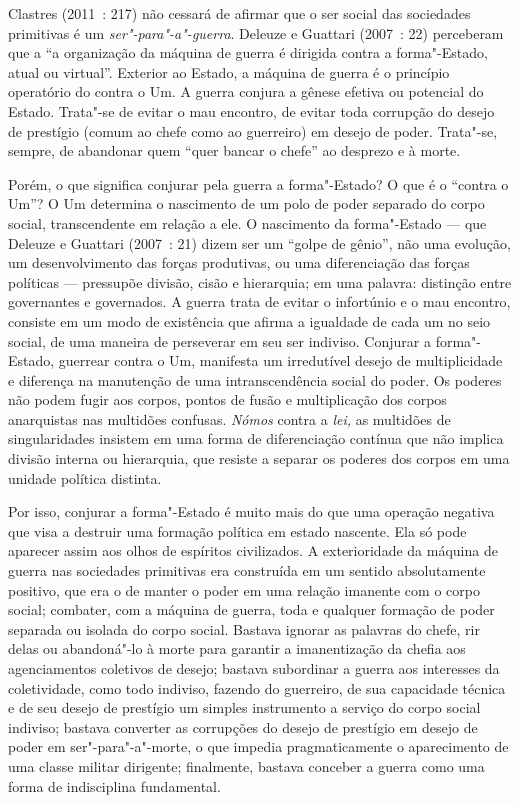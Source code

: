 Clastres (2011~: 217) não cessará de afirmar que o ser social das
sociedades primitivas é um \emph{ser"-para"-a"-guerra}. Deleuze e Guattari
(2007~: 22) perceberam que a ``a organização da máquina de guerra é
dirigida contra a forma"-Estado, atual ou virtual''. Exterior ao Estado,
a máquina de guerra é o princípio operatório do contra o Um. A guerra
conjura a gênese efetiva ou potencial do Estado. Trata"-se de evitar o
mau encontro, de evitar toda corrupção do desejo de prestígio (comum ao
chefe como ao guerreiro) em desejo de poder. Trata"-se, sempre, de
abandonar quem ``quer bancar o chefe'' ao desprezo e à morte.

Porém, o que significa conjurar pela guerra a forma"-Estado? O que é o
``contra o Um''? O Um determina o nascimento de um polo de poder
separado do corpo social, transcendente em relação a ele. O nascimento
da forma"-Estado --- que Deleuze e Guattari (2007~: 21) dizem ser um
``golpe de gênio'', não uma evolução, um desenvolvimento das forças
produtivas, ou uma diferenciação das forças políticas --- pressupõe
divisão, cisão e hierarquia; em uma palavra: distinção entre governantes
e governados. A guerra trata de evitar o infortúnio e o mau encontro,
consiste em um modo de existência que afirma a igualdade de cada um no
seio social, de uma maneira de perseverar em seu ser indiviso. Conjurar
a forma"-Estado, guerrear contra o Um, manifesta um irredutível desejo de
multiplicidade e diferença na manutenção de uma intranscendência social
do poder. Os poderes não podem fugir aos corpos, pontos de fusão e
multiplicação dos corpos anarquistas nas multidões confusas. \emph{Nómos
}contra a \emph{lei, }as multidões de singularidades insistem em uma
forma de diferenciação contínua que não implica divisão interna ou
hierarquia, que resiste a separar os poderes dos corpos em uma unidade
política distinta.

Por isso, conjurar a forma"-Estado é muito mais do que uma operação
negativa que visa a destruir uma formação política em estado nascente.
Ela só pode aparecer assim aos olhos de espíritos civilizados. A
exterioridade da máquina de guerra nas sociedades primitivas era
construída em um sentido absolutamente positivo, que era o de manter o
poder em uma relação imanente com o corpo social; combater, com a
máquina de guerra, toda e qualquer formação de poder separada ou isolada
do corpo social. Bastava ignorar as palavras do chefe, rir delas ou
abandoná"-lo à morte para garantir a imanentização da chefia aos
agenciamentos coletivos de desejo; bastava subordinar a guerra aos
interesses da coletividade, como todo indiviso, fazendo do guerreiro, de
sua capacidade técnica e de seu desejo de prestígio um simples
instrumento a serviço do corpo social indiviso; bastava converter as
corrupções do desejo de prestígio em desejo de poder em
ser"-para"-a"-morte, o que impedia pragmaticamente o aparecimento de uma
classe militar dirigente; finalmente, bastava conceber a guerra como uma
forma de indisciplina fundamental.

